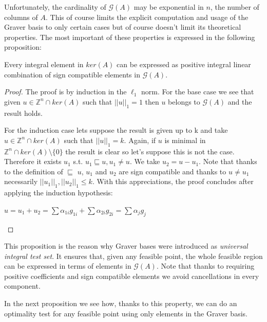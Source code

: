 Unfortunately, the cardinality of $\mathcal{G}(A)$ may be exponential in $n$, the number of columns of $A$. This of course limits the explicit computation and usage of the Graver basis to only certain cases but of course doesn't limit its theoretical properties. The most important of these properties is expressed in the following proposition:

\begin{proposition}
Every integral element in $ker(A)$ can be expressed as positive integral linear combination of sign compatible elements in $\mathcal{G}(A)$.
\end{proposition}
\vspace{-20pt}
\begin{proof}
The proof is by induction in the $\ell_1$ norm. For the base case we see that given $u \in \mathbb{Z}^n\cap ker(A)$ such that $||u||_1 = 1$ then $u$ belongs to $\mathcal{G}(A)$ and the result holds.

For the induction case lets suppose the result is given up to k and take $u \in \mathbb{Z}^n\cap ker(A)$ such that $||u||_1 = k$. Again, if $u$ is minimal in $\mathbb{Z}^n\cap ker(A) \setminus \{0\}$ the result is clear so let's suppose this is not the case. Therefore it exists $u_1$ s.t. $u_1 \sqsubseteq u, u_1 \neq u$. We take $u_2 = u - u_1$. Note that thanks to the definition of $\sqsubseteq$ $u$, $u_1$ and $u_2$ are sign compatible and thanks to $u \neq u_1$ necessarily  $||u_1||_1,||u_2||_1 \leq k$. With this appreciations, the proof concludes after applying the induction hypothesis:\\
\vspace{-30pt}
\begin{center}
    $u = u_1 + u_2 = \sum \alpha_{1i}g_{1i} + \sum \alpha_{2i}g_{2i} = \sum \alpha_{j}g_{j}$
\end{center}
\end{proof}

This proposition is the reason why Graver bases were introduced as \textit{universal integral test set}. It ensures that, given any feasible point, the whole feasible region can be expressed in terms of elements in $\mathcal{G}(A)$. Note that thanks to requiring positive coefficients and sign compatible elements we avoid cancellations in every component. 

In the next proposition we see how, thanks to this property, we can do an optimality test for any feasible point using only elements in the Graver basis.


